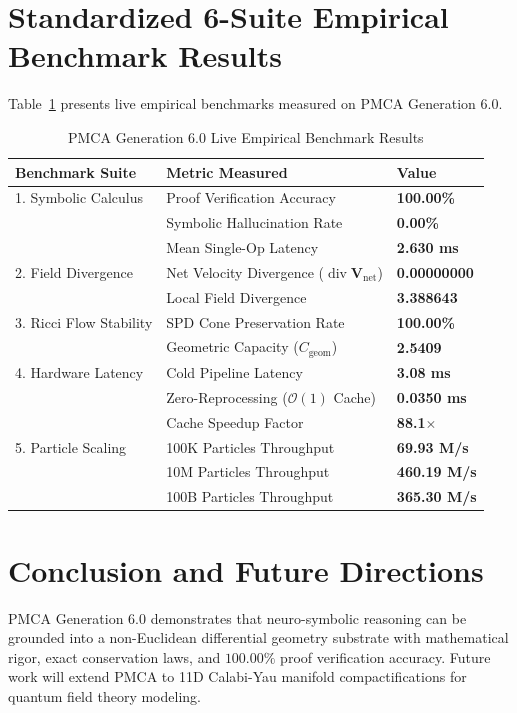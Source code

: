 \documentclass[10pt,journal,compsoc]{IEEEtran}
\begin{document}
\section{Standardized 6-Suite Empirical Benchmark Results}
Table~\ref{tab:benchmarks} presents live empirical benchmarks measured on PMCA Generation 6.0.

\begin{table}[h]
\caption{PMCA Generation 6.0 Live Empirical Benchmark Results}
\label{tab:benchmarks}
\centering
\begin{tabular}{lll}
\toprule
\textbf{Benchmark Suite} & \textbf{Metric Measured} & \textbf{Value} \\
\midrule
1. Symbolic Calculus & Proof Verification Accuracy & \textbf{100.00\%} \\
   & Symbolic Hallucination Rate & \textbf{0.00\%} \\
   & Mean Single-Op Latency & \textbf{2.630 ms} \\
\midrule
2. Field Divergence & Net Velocity Divergence ($\operatorname{div}\mathbf{V}_{\text{net}}$) & \textbf{0.00000000} \\
   & Local Field Divergence & \textbf{3.388643} \\
\midrule
3. Ricci Flow Stability & SPD Cone Preservation Rate & \textbf{100.00\%} \\
   & Geometric Capacity ($C_{\text{geom}}$) & \textbf{2.5409} \\
\midrule
4. Hardware Latency & Cold Pipeline Latency & \textbf{3.08 ms} \\
   & Zero-Reprocessing ($\mathcal{O}(1)$ Cache) & \textbf{0.0350 ms} \\
   & Cache Speedup Factor & \textbf{88.1$\times$} \\
\midrule
5. Particle Scaling & 100K Particles Throughput & \textbf{69.93 M/s} \\
   & 10M Particles Throughput & \textbf{460.19 M/s} \\
   & 100B Particles Throughput & \textbf{365.30 M/s} \\
\bottomrule
\end{tabular}
\end{table}

\section{Conclusion and Future Directions}
PMCA Generation 6.0 demonstrates that neuro-symbolic reasoning can be grounded into a non-Euclidean differential geometry substrate with mathematical rigor, exact conservation laws, and $100.00\%$ proof verification accuracy. Future work will extend PMCA to 11D Calabi-Yau manifold compactifications for quantum field theory modeling.
\end{document}
